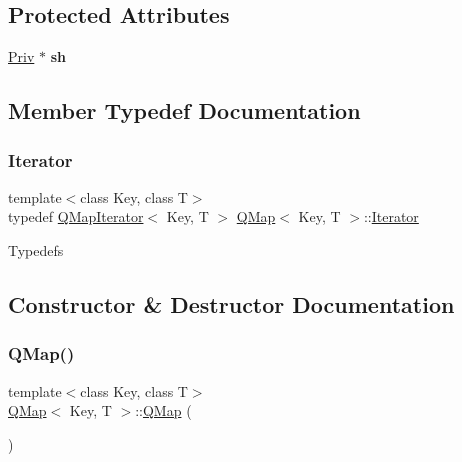 \subsection*{Protected Attributes}
\begin{DoxyCompactItemize}
\item 
\mbox{\label{class_q_map_af8bec306bf8ee3e0effffe9a33b6c013}} 
\mbox{\hyperlink{class_q_map_private}{Priv}} $\ast$ {\bfseries sh}
\end{DoxyCompactItemize}


\subsection{Member Typedef Documentation}
\mbox{\label{class_q_map_aa920e1d34440b34269b350ab96bd73d0}} 
\subsubsection{\texorpdfstring{Iterator}{Iterator}}
{\footnotesize\ttfamily template$<$class Key, class T$>$ \\
typedef \mbox{\hyperlink{class_q_map_iterator}{Q\+Map\+Iterator}}$<$ Key, T $>$ \mbox{\hyperlink{class_q_map}{Q\+Map}}$<$ Key, T $>$\+::\mbox{\hyperlink{class_q_map_aa920e1d34440b34269b350ab96bd73d0}{Iterator}}}

Typedefs 

\subsection{Constructor \& Destructor Documentation}
\mbox{\label{class_q_map_a72c9b87bd2e154fc1a0afc0bd6cc4223}} 
\subsubsection{\texorpdfstring{QMap()}{QMap()}}
{\footnotesize\ttfamily template$<$class Key, class T$>$ \\
\mbox{\hyperlink{class_q_map}{Q\+Map}}$<$ Key, T $>$\+::\mbox{\hyperlink{class_q_map}{Q\+Map}} (\begin{DoxyParamCaption}{ }\end{DoxyParamCaption})\hspace{0.3cm}{\ttfamily [inline]}}

